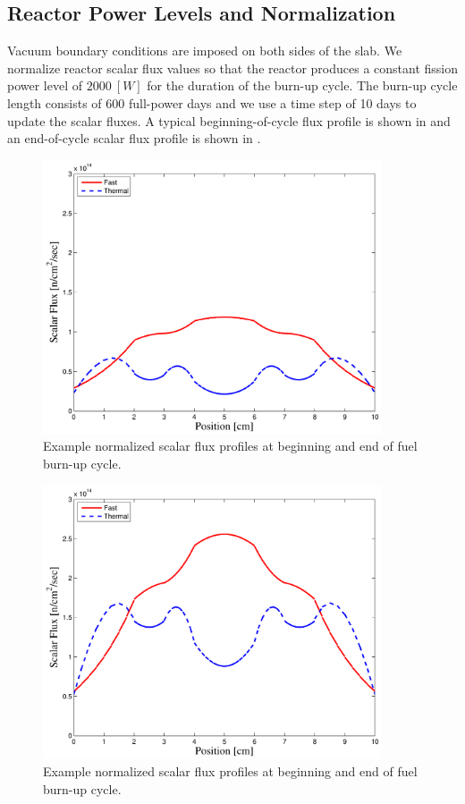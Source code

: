\subsection{Reactor Power Levels and Normalization}

Vacuum boundary conditions are imposed on both sides of the slab.  
We normalize reactor scalar flux values so that the reactor produces a constant fission power level of $2000~[W]$ for the duration of the burn-up cycle.
The burn-up cycle length consists of 600 full-power days and we use a time step of 10 days to update the scalar fluxes.
A typical beginning-of-cycle flux profile is shown in  and an end-of-cycle scalar flux profile is shown in .  
\begin{figure}[!htp]
\centering
\includegraphics[width=10cm]{chapter5_depletion/P1_Lobatto_full_80_cells_t_steps60_End_600_Power_2000__BOC_Flux.pdf}
\caption{Example normalized scalar flux profiles at beginning and end of fuel burn-up cycle.}
\label{fig:ex_boc_cycle}
\end{figure}

\begin{figure}[!hbp]
\centering
\includegraphics[width=10cm]{chapter5_depletion/P1_Lobatto_full_80_cells_t_steps60_End_600_Power_2000__EOC_Flux.pdf}
\caption{Example normalized scalar flux profiles at beginning and end of fuel burn-up cycle.}
\label{fig:ex_eoc_cycle}
\end{figure}

